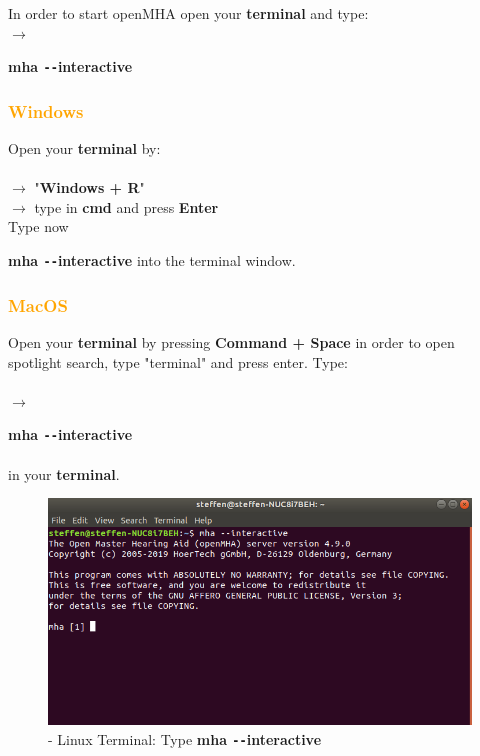 \documentclass[11pt,a4paper,twoside]{article}
\newcommand{\+}{\discretionary{\mbox{\scriptsize$\hookleftarrow$}}{}{}}
\begin{document}
In order to start openMHA open your \textbf{terminal} and type: \\
$\rightarrow$ {{\ttfamily \textbf{mha \texttt{-{}-}interactive}} 


\subsubsection*{\textcolor{orange}{Windows}}}
Open your \textbf{terminal} by: \\ \\
$\rightarrow$ "\textbf{Windows + R}" \\
    $\rightarrow$ type in {{\ttfamily \textbf{cmd}}} and press \textbf{Enter} \\
    Type now {{\ttfamily \textbf{mha \texttt{-{}-}interactive}}  into the terminal window. 
   


\subsubsection*{\textcolor{orange}{MacOS}}

Open your \textbf{terminal} by pressing \textbf{Command + Space} in order to open spotlight search, type "terminal" and press enter. Type: \\ \\
$\rightarrow$ {{\ttfamily \textbf{mha \texttt{-{}-}interactive}} \\ \\ in your \textbf{terminal}.\\


\begin{figure}[H]
\centering
\includegraphics[scale=0.4]{mha_interactive.png}
\caption{- Linux Terminal: Type {{\ttfamily \textbf{mha \texttt{-{}-}interactive}}}}
\end{figure}


}}
\end{document}
